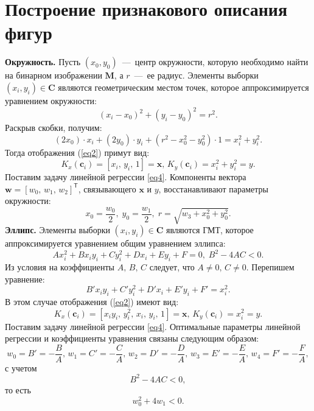 \documentclass[12pt,twoside]{article}
\begin{document}
\section{Построение признакового описания фигур}
\textbf{Окружность.} Пусть $(x_0, y_0)$~---~центр окружности, которую необходимо найти на бинарном изображении $\mathbf{M}$, а $r$~---~ее радиус. Элементы выборки $(x_i, y_i) \in \mathbf{C}$ являются геометрическим местом точек, которое аппроксимируется уравнением окружности: \begin{equation}(x_i - x_0)^2 + (y_i - y_0)^2 = r^2.\end{equation} Раскрыв скобки, получим: \begin{equation}(2x_0)\cdot x_i + (2y_0)\cdot y_i + (r^2 - x_0^2 - y_0^2)\cdot 1 = x_i^2 + y_i^2 . \end{equation}
Тогда отображения (\ref{eq2}) примут вид:
\begin{equation}\label{10}
K_{x}(\mathbf{c}_i) = [x_i, \, y_i, \, 1] = \mathbf{x}, \,  K_{y}(\mathbf{c}_i) = x_i^2+y_i^2 = y.
\end{equation} 
Поставим задачу линейной регрессии \eqref{eq4}.
Компоненты вектора $\mathbf{w} = [w_0, \, w_1, \, w_2]^\mathsf{T}$, связывающего $\mathbf{x}$ и $y$, восстанавливают параметры окружности: \begin{equation} x_0 = \frac{w_0}{2}, \; y_0 = \frac{w_1}{2}, \; r = \sqrt{w_3 + x_0^2 + y_0 ^2}.\end{equation}
\textbf{Эллипс.} Элементы выборки $(x_i, y_i) \in \mathbf{C}$ являются ГМТ, которое аппроксимируется уравнением общим уравнением эллипса: \begin{equation}Ax_i^2+Bx_iy_i+Cy_i^2 + Dx_i + Ey_i + F = 0, \; B^2 - 4AC < 0.\end{equation} Из условия на коэффициенты $A, \, B, \, C$ следует, что $A \neq 0, \, C \neq 0$. Перепишем уравнение: \begin{equation} B'x_iy_i + C'y_i^2 + D'x_i + E'y_i + F' = x_i^2.\end{equation}
В этом случае отображения (\ref{eq2}) имеют вид: 
\begin{equation}K_{x}(\mathbf{c}_i) = [x_iy_i, \, y_i^2, \, x_i, \, y_i, \, 1] = \mathbf{x}, \,  K_{y}(\mathbf{c}_i) = x_i^2 = y.\end{equation}
Поставим задачу линейной регрессии \eqref{eq4}.
Оптимальные параметры линейной регрессии и коэффициенты уравнения связаны следующим образом: \begin{equation}w_0 = B' = -\frac{B}{A}, \, w_1 = C' = -\frac{C}{A}, \, w_2 = D' = -\frac{D}{A}, \, w_3 = E' = -\frac{E}{A}, \, w_4 = F' = -\frac{F}{A},\end{equation} с учетом \begin{equation} \label{16}B^2 - 4AC < 0,\end{equation} то есть \begin{equation}w_0^2 + 4w_1 < 0.\end{equation} \\
\end{document}
